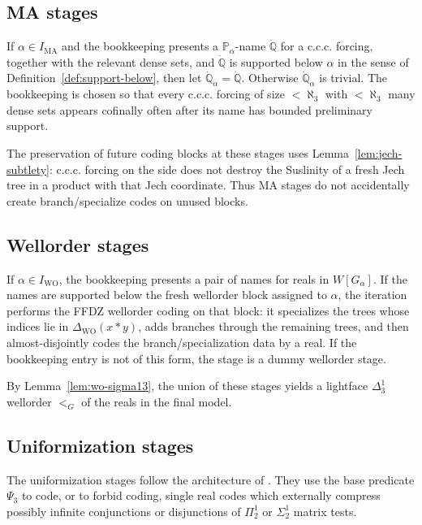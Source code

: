 \documentclass[11pt]{article}
\theoremstyle{plain}
\theoremstyle{definition}
\theoremstyle{remark}
\newcommand{\Pp}{\mathbb P}
\newcommand{\dotQ}{\dot{\mathbb Q}}
\newcommand{\PsiThree}{\Psi_{3}}
\newcommand{\Wground}{W}
\begin{document}
\subsection{MA stages}

If $\alpha\in I_{\mathrm{MA}}$ and the bookkeeping presents a $\Pp_\alpha$-name
$\dot{\mathbb Q}$ for a c.c.c. forcing, together with the relevant dense sets,
and $\dot{\mathbb Q}$ is supported below $\alpha$ in the sense of
Definition~\ref{def:support-below}, then let $\dotQ_\alpha=\dot{\mathbb Q}$.
Otherwise $\dotQ_\alpha$ is trivial.  The bookkeeping is chosen so that every
c.c.c. forcing of size $<\aleph_3$ with $<\aleph_3$ many dense sets appears
cofinally often after its name has bounded preliminary support.

The preservation of future coding blocks at these stages uses
Lemma~\ref{lem:jech-subtlety}: c.c.c. forcing on the side does not destroy the
Suslinity of a fresh Jech tree in a product with that Jech coordinate.  Thus MA
stages do not accidentally create branch/specialize codes on unused blocks.

\subsection{Wellorder stages}

If $\alpha\in I_{\mathrm{WO}}$, the bookkeeping presents a pair of names for reals
in $\Wground[G_\alpha]$.  If the names are supported below the fresh wellorder
block assigned to $\alpha$, the iteration performs the FFDZ wellorder coding on
that block: it specializes the trees whose indices lie in
$\Delta_{\mathrm{WO}}(x*y)$, adds branches through the remaining trees, and then
almost-disjointly codes the branch/specialization data by a real.  If the
bookkeeping entry is not of this form, the stage is a dummy wellorder stage.

By Lemma~\ref{lem:wo-sigma13}, the union of these stages yields a lightface
$\Delta^1_3$ wellorder $<_G$ of the reals in the final model.


\subsection{Uniformization stages}\label{subsec:uniformization-stages}

The uniformization stages follow the architecture of
\cite{BPFA_and_global_Sigma-uniformization}.  They use the base predicate $\PsiThree$ to code,
or to forbid coding, single real codes which externally compress possibly
infinite conjunctions or disjunctions of $\Pi^1_2$ or $\Sigma^1_2$ matrix tests.
\end{document}

